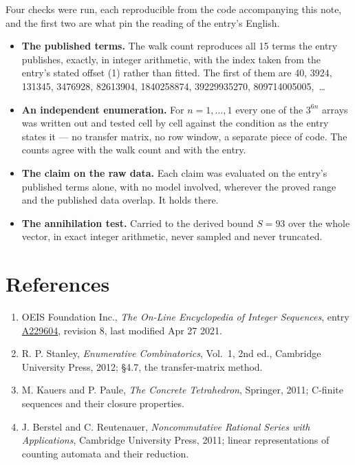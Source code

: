 \documentclass[11pt]{article}
\theoremstyle{definition}
\begin{document}
Four checks were run, each reproducible from the code accompanying this note, and the first two are what pin the reading of the entry's English.

\begin{itemize}

\item {\bfseries The published terms.} The walk count reproduces all 15 terms the entry publishes, exactly, in integer arithmetic, with the index taken from the entry's stated offset (1) rather than fitted. The first of them are 40, 3924, 131345, 3476928, 82613904, 1840258874, 39229935270, 809714005005,~\dots

\item {\bfseries An independent enumeration.} For $n = 1,\dots,1$ every one of the $3^{6n}$ arrays was written out and tested cell by cell against the condition as the entry states it --- no transfer matrix, no row window, a separate piece of code. The counts agree with the walk count and with the entry.

\item {\bfseries The claim on the raw data.} Each claim was evaluated on the entry's published terms alone, with no model involved, wherever the proved range and the published data overlap. It holds there.

\item {\bfseries The annihilation test.} Carried to the derived bound $S = 93$ over the whole vector, in exact integer arithmetic, never sampled and never truncated.

\end{itemize}

\section{References}

\begin{enumerate}

\item OEIS Foundation Inc., \emph{The On-Line Encyclopedia of Integer Sequences}, entry \href{https://oeis.org/A229604}{A229604}, revision 8, last modified Apr 27 2021.

\item R. P. Stanley, \emph{Enumerative Combinatorics}, Vol.~1, 2nd ed., Cambridge University Press, 2012; \S4.7, the transfer-matrix method.

\item M. Kauers and P. Paule, \emph{The Concrete Tetrahedron}, Springer, 2011; C-finite sequences and their closure properties.

\item J. Berstel and C. Reutenauer, \emph{Noncommutative Rational Series with Applications}, Cambridge University Press, 2011; linear representations of counting automata and their reduction.

\end{enumerate}
\end{document}
